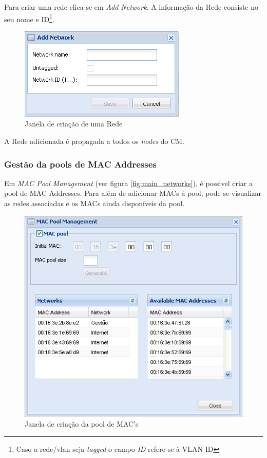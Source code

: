 Para criar uma rede clica-se em \emph{Add Network}.
A informação da Rede consiste no seu nome e ID\footnote{Caso a rede/vlan seja \emph{tagged} o campo \emph{ID} refere-se à {VLAN ID}}.

\begin{figure}[H]
	\begin{center}
	\includegraphics[scale=0.5]{screenshots/network_create.png}
	\caption{Janela de criação de uma Rede}
	\label{fig:network_create}
	\end{center}
\end{figure}
A Rede adicionada é propagada a todos os \emph{nodes} do CM.

\subsubsection{Gestão da pools de MAC Addresses}
\label{sec:mac_pool}

Em \emph{MAC Pool Management} (ver figura \ref{fig:main_networks}), é possivel criar a pool de MAC Addresses.
Para além de adicionar MACs à pool, pode-se visualizar as redes associadas e os MACs ainda disponíveis da pool.

\begin{figure}[H]
	\begin{center}
	\includegraphics[scale=0.5]{screenshots/networks_macpool.png}
	\caption{Janela de criação da pool de MAC's}
	\label{fig:networks_macpool}
	\end{center}
\end{figure}


